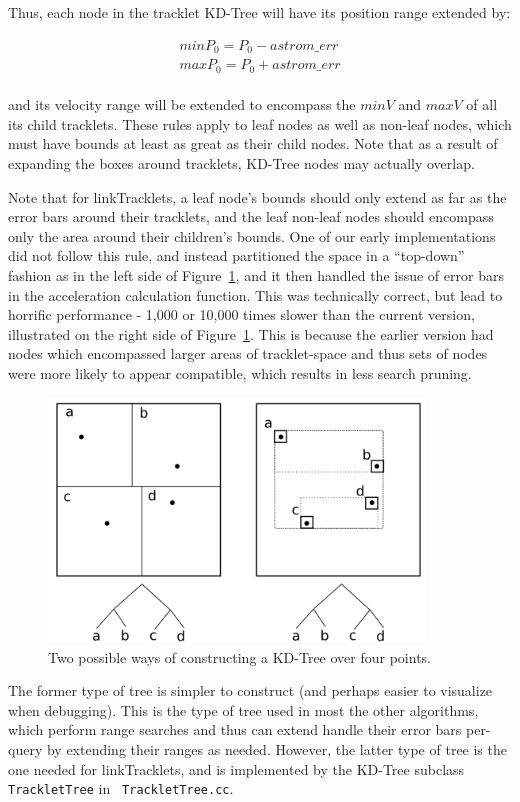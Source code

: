 Thus, each node in the tracklet KD-Tree will have its position range extended by:

\begin{eqnarray}
minP_0 = P_0 - astrom\_err \\
maxP_0 = P_0 + astrom\_err  
\end{eqnarray}
\\ and its velocity range will be extended to encompass the $minV$ and
$maxV$ of all its child tracklets.  These rules apply to leaf nodes as
well as non-leaf nodes, which must have bounds at least as great as
their child nodes.  Note that as a result of expanding the boxes
around tracklets, KD-Tree nodes may actually overlap.

Note that for linkTracklets, a leaf node's bounds should only extend
as far as the error bars around their tracklets, and the leaf non-leaf
nodes should encompass only the area around their children's bounds.
One of our early implementations did not follow this rule, and instead
partitioned the space in a ``top-down'' fashion as in the left side of
Figure~\ref{trackletTree}, and it then handled the issue of error bars
in the acceleration calculation function.  This was technically
correct, but lead to horrific performance - 1,000 or 10,000 times
slower than the current version, illustrated on the right side of
Figure~\ref{trackletTree}.  This is because the earlier version had
nodes which encompassed larger areas of tracklet-space and thus sets
of nodes were more likely to appear compatible, which results in less
search pruning.

\begin{figure}[ht!]
\centering
\includegraphics[width=10cm]{illustrations/kdTree_trackletTree.png}
\caption{Two possible ways of constructing a KD-Tree over four points.}
\label{trackletTree}
\end{figure}

The former type of tree is simpler to construct (and perhaps easier to
visualize when debugging).  This is the type of tree used in most the
other algorithms, which perform range searches and thus can extend
handle their error bars per-query by extending their ranges as needed.
However, the latter type of tree is the one needed for linkTracklets,
and is implemented by the KD-Tree subclass {\tt TrackletTree} in {\tt
  TrackletTree.cc}.


